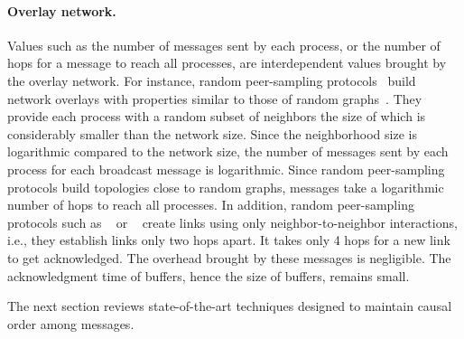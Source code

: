 

\paragraph{Overlay network.} Values such as the number of messages sent by each
process, or the number of hops for a message to reach all processes, are
interdependent values brought by the overlay network. For instance, random
peer-sampling protocols~\cite{jelasity2007gossip} build network overlays with
properties similar to those of random graphs~\cite{erdos1959random}. They
provide each process with a random subset of neighbors the size of which is
considerably smaller than the network size. Since the neighborhood size is
logarithmic compared to the network size, the number of messages sent by each
process for each broadcast message is logarithmic.  Since random peer-sampling
protocols build topologies close to random graphs, messages take a logarithmic
number of hops to reach all processes. In addition, random peer-sampling
protocols such as \SPRAY~\cite{nedelec2017adaptive} or
\CYCLON~\cite{voulgaris2005cyclon} create links using only neighbor-to-neighbor
interactions, i.e., they establish links only two hops apart. It takes only 4
hops for a new link to get acknowledged.  The overhead brought by these messages
is negligible. The acknowledgment time of buffers, hence the size of buffers,
remains small.

The next section reviews state-of-the-art techniques designed to maintain causal
order among messages.

